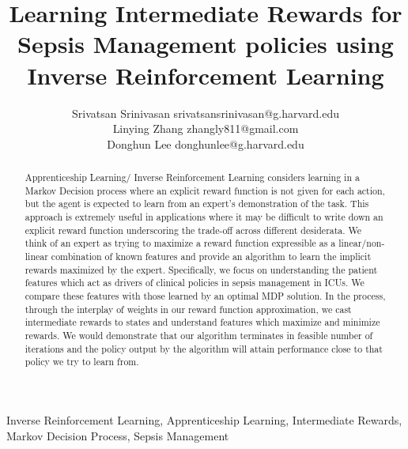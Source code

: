 \documentclass[twoside,11pt]{article}
\begin{document}
\title{Learning Intermediate Rewards for Sepsis Management policies using Inverse Reinforcement Learning}

\author{\name Srivatsan Srinivasan \email srivatsansrinivasan@g.harvard.edu \\
       \AND
       \name Linying Zhang \email zhangly811@gmail.com \\
       \AND
       \name Donghun Lee \email donghunlee@g.harvard.edu \\
       }
\editor{}
\maketitle

\begin{abstract}%
Apprenticeship Learning/ Inverse Reinforcement Learning considers learning in a Markov Decision process where an explicit reward function is not given for each action, but the agent is expected to learn from an expert's demonstration of the task. This approach is extremely useful in applications where it may be difficult to write down an explicit reward function underscoring the trade-off across different desiderata. We think of an expert as trying to maximize a reward function expressible as a linear/non-linear combination of known features and provide an algorithm to learn the implicit rewards maximized by the expert. Specifically, we focus on understanding the patient features which act as drivers of clinical policies in sepsis management in ICUs. We compare these features with those learned by an optimal MDP solution. In the process, through the interplay of weights in our reward function approximation, we cast intermediate rewards to states and understand features which maximize and minimize rewards. We would demonstrate that our algorithm terminates in feasible number of iterations and the policy output by the algorithm will attain performance close to that policy we try to learn from.  
\end{abstract}

\begin{keywords}
  Inverse Reinforcement Learning, Apprenticeship Learning, Intermediate Rewards, Markov Decision Process, Sepsis Management
\end{keywords}
\end{document}

